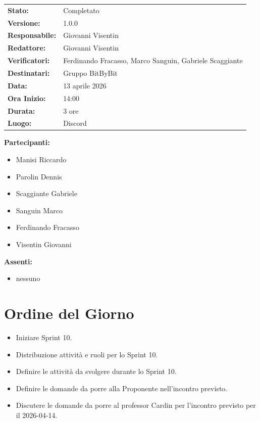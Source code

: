 \documentclass[a4paper,12pt]{article}
\begin{document}
\begin{tcolorbox}
\begin{tabularx}{\textwidth}{@{}l X@{}}
\textbf{Stato:} & Completato\\
\textbf{Versione:} & 1.0.0\\
\textbf{Responsabile:} & Giovanni Visentin\\
\textbf{Redattore:} & Giovanni Visentin \\
\textbf{Verificatori:} & Ferdinando Fracasso, Marco Sanguin, Gabriele Scaggiante\\
\textbf{Destinatari:} & Gruppo BitByBit\\
\textbf{Data:} & 13 aprile 2026 \\
\textbf{Ora Inizio:} & 14:00 \\
\textbf{Durata:} & 3 ore \\
\textbf{Luogo:} & Discord \\
\end{tabularx}
\end{tcolorbox}

\vspace{0.4cm}
\textbf{Partecipanti:}
\begin{itemize}
    \item Manisi Riccardo
    \item Parolin Dennis
    \item Scaggiante Gabriele
    \item Sanguin Marco
    \item Ferdinando Fracasso
    \item Visentin Giovanni
\end{itemize}

\textbf{Assenti:}
\begin{itemize}
    \item nessuno
\end{itemize}

\clearpage

\vspace{0.5cm}

\vspace{0.8cm}

\clearpage
\tableofcontents
\thispagestyle{empty} %
\clearpage

\section{Ordine del Giorno}
\begin{itemize}
    \item Iniziare Sprint 10.
    \item Distribuzione attività e ruoli per lo Sprint 10.
    \item Definire le attività da svolgere durante lo Sprint 10.
    \item Definire le domande da porre alla Proponente nell'incontro previsto.
    \item Discutere le domande da porre al professor Cardin per l'incontro previsto per il 2026-04-14.
\end{itemize}
\end{document}
